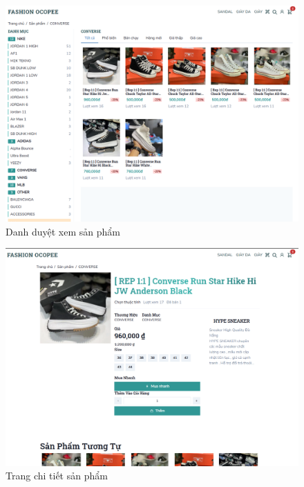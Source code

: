 \begin{figure}[h!]
	\begin{center}	
		\includegraphics[width=\textwidth]{./results/categories-page}
		\caption{Danh duyệt xem sản phẩm}
	\end{center}
\end{figure}

\begin{figure}[h!]
	\begin{center}	
		\includegraphics[width=\textwidth]{./results/product-page}
		\caption{Trang chi tiết sản phẩm}
	\end{center}
\end{figure}


